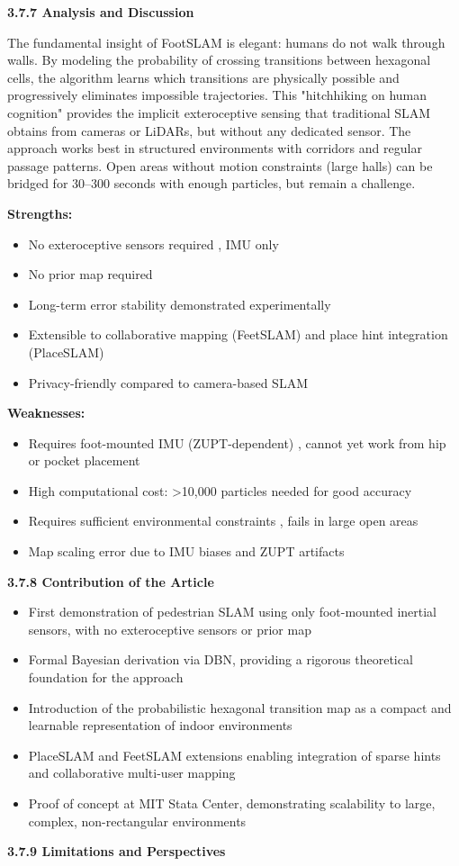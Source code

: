 \documentclass{ipgpmaster}
\begin{document}
\textbf{3.7.7    Analysis and Discussion}

The fundamental insight of FootSLAM is elegant: humans do not walk through walls. By modeling the probability of crossing transitions between hexagonal cells, the algorithm learns which transitions are physically possible and progressively eliminates impossible trajectories. This "hitchhiking on human cognition" provides the implicit exteroceptive sensing that traditional SLAM obtains from cameras or LiDARs, but without any dedicated sensor. The approach works best in structured environments with corridors and regular passage patterns. Open areas without motion constraints (large halls) can be bridged for 30–300 seconds with enough particles, but remain a challenge.

\textbf{Strengths:}

\begin{itemize}
    \item No exteroceptive sensors required ,  IMU only
    \item No prior map required
    \item Long-term error stability demonstrated experimentally
    \item Extensible to collaborative mapping (FeetSLAM) and place hint integration (PlaceSLAM)
    \item Privacy-friendly compared to camera-based SLAM
\end{itemize}
\textbf{Weaknesses:}

\begin{itemize}
    \item Requires foot-mounted IMU (ZUPT-dependent) ,  cannot yet work from hip or pocket placement
    \item High computational cost: >10,000 particles needed for good accuracy
    \item Requires sufficient environmental constraints ,  fails in large open areas
    \item Map scaling error due to IMU biases and ZUPT artifacts


\end{itemize}
\textbf{3.7.8    Contribution of the Article}

\begin{itemize}
    \item First demonstration of pedestrian SLAM using only foot-mounted inertial sensors, with no exteroceptive sensors or prior map
    \item Formal Bayesian derivation via DBN, providing a rigorous theoretical foundation for the approach
    \item Introduction of the probabilistic hexagonal transition map as a compact and learnable representation of indoor environments
    \item PlaceSLAM and FeetSLAM extensions enabling integration of sparse hints and collaborative multi-user mapping
    \item Proof of concept at MIT Stata Center, demonstrating scalability to large, complex, non-rectangular environments


\end{itemize}
\textbf{3.7.9    Limitations and Perspectives}
\end{document}
